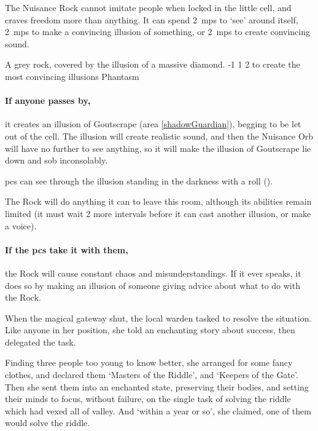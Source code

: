 \begin{multicols}{2}
The Nuisance Rock cannot imitate people when locked in the little cell, and craves freedom more than anything.
It can spend 2~\glspl{mp} to `see' around itself, 2~\glspl{mp} to make a convincing illusion of something, or 2~\glspl{mp} to create convincing sound.

  {A grey rock, covered by the illusion of a massive diamond.}%
  {-1}%
  {1}%
  {2}%
  {to create the most convincing illusions}%
  {Phantasm}%
  {
    \setcounter{Fire}{2}
    \setcounter{Earth}{2}
    \setcounter{Air}{2}
    \setcounter{Academics}{2}
    \setcounter{Wyldcrafting}{1}
  }%

\showStdSpells[
  \setcounter{diceNo}{0}
]

\paragraph{If anyone passes by,}
it creates an illusion of Goutscrape (area \vref{shadowGuardian}), begging to be let out of the cell.
The illusion will create realistic sound, and then the Nuisance Orb will have no further  to see anything, so it will make the illusion of Goutscrape lie down and sob inconsolably.

\Glspl{pc} can see through the illusion standing in the darkness with a  roll
(\tn[12]).

The Rock will do anything it can to leave this room, although its abilities remain limited (it must wait 2 more \glspl{interval} before it can cast another illusion, or make a voice).

\paragraph{If the \glspl{pc} take it with them,}
the Rock will cause constant chaos and misunderstandings.
If it ever speaks, it does so by making an illusion of someone giving advice about what to do with the Rock.


\begin{exampletext}
  When the magical gateway shut, the local \gls{warden} tasked  to resolve the situation.
  Like anyone in her position, she told an enchanting story about success, then delegated the task.

  Finding three people too young to know better, she arranged for some fancy clothes, and declared them `Masters of the Riddle', and `Keepers of the Gate'.
  Then she sent them into an enchanted state, preserving their bodies, and setting their minds to focus, without failure, on the single task of solving the riddle which had vexed all of \gls{valley}.
  And `within a year or so', she claimed, one of them would solve the riddle.


\end{exampletext}
\end{multicols}
